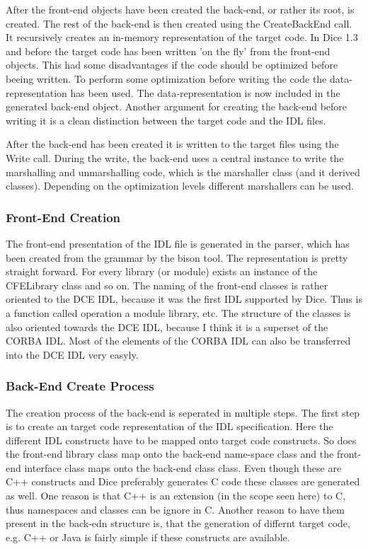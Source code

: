 After the front-end objects have been created the back-end, or rather
its root, is created. The rest of the back-end is then created using
the CreateBackEnd call. It recursively creates an in-memory
representation of the target code. In Dice 1.3 and before the target
code has been written 'on the fly' from the front-end objects. This
had some disadvantages if the code should be optimized before beeing
written. To perform some optimization before writing the code the
data-representation has been used. The data-representation is now
included in the generated back-end object. Another argument for
creating the back-end before writing it is a clean distinction between
the target code and the IDL files.

After the back-end has been created it is written to the target files
using the Write call. During the write, the back-end uses a central
instance to write the marshalling and unmarshalling code, which is the
marshaller class (and it derived classes). Depending on the
optimization levels different marshallers can be used.

\subsubsection{Front-End Creation}
The front-end presentation of the IDL file is generated in the parser,
which has been created from the grammar by the bison tool. The
representation is pretty straight forward. For every library (or
module) exists an instance of the CFELibrary class and so on. The
naming of the front-end classes is rather oriented to the DCE IDL,
because it was the first IDL supported by Dice. Thus is a function
called operation a module library, etc. The structure of the classes
is also oriented towards the DCE IDL, because I think it is a superset
of the CORBA IDL. Most of the elements of the CORBA IDL can also be
transferred into the DCE IDL very easyly.

\subsubsection{Back-End Create Process}
The creation process of the back-end is seperated in multiple
steps. The first step is to create an target code representation of
the IDL specification. Here the different IDL constructs have to be
mapped onto target code constructs. So does the front-end library
class map onto the back-end name-space class and the front-end
interface class maps onto the back-end class class. Even though these
are C++ constructs and Dice preferably generates C code these classes
are generated as well. One reason is that C++ is an extension (in the
scope seen here) to C, thus namespaces and classes can be ignore in
C. Another reason to have them present in the back-edn structure is,
that the generation of differnt target code, e.g. C++ or Java is
fairly simple if these constructs are available.

